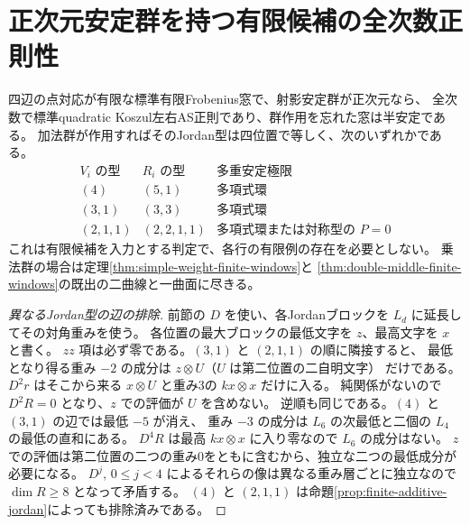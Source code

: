 \section{正次元安定群を持つ有限候補の全次数正則性}
\label{sec:finite-connected-regularity}
\begin{theorem}\label{thm:finite-connected-regularity}
四辺の点対応が有限な標準有限Frobenius窓で、射影安定群が正次元なら、
全次数で標準quadratic Koszul左右AS正則であり、群作用を忘れた窓は半安定である。
加法群が作用すればそのJordan型は四位置で等しく、次のいずれかである。
\[
\begin{array}{c|c|l}
V_i\text{ の型}&R_i\text{ の型}&\text{多重安定極限}\\\hline
(4)&(5,1)&\text{多項式環}\\
(3,1)&(3,3)&\text{多項式環}\\
(2,1,1)&(2,2,1,1)&\text{多項式環または対称型の }P=0
\end{array}
\]
これは有限候補を入力とする判定で、各行の有限例の存在を必要としない。
乗法群の場合は定理\ref{thm:simple-weight-finite-windows}と
\ref{thm:double-middle-finite-windows}の既出の二曲線と一曲面に尽きる。
\end{theorem}
\begin{proof}[異なるJordan型の辺の排除]
前節の $D$ を使い、各Jordanブロックを $L_d$ に延長してその対角重みを使う。
各位置の最大ブロックの最低文字を $z$、最高文字を $x$ と書く。
$zz$ 項は必ず零である。$(3,1)$ と $(2,1,1)$ の順に隣接すると、
最低となり得る重み $-2$ の成分は $z\otimes U$（$U$ は第二位置の二自明文字）
だけである。$D^2r$ はそこから来る $x\otimes U$ と重み3の $kx\otimes x$ だけに入る。
純関係がないので $D^2 R=0$ となり、$z$ での評価が $U$ を含めない。
逆順も同じである。$(4)$ と $(3,1)$ の辺では最低 $-5$ が消え、
重み $-3$ の成分は $L_6$ の次最低と二個の $L_4$ の最低の直和にある。
$D^4R$ は最高 $kx\otimes x$ に入り零なので $L_6$ の成分はない。
$z$ での評価は第二位置の二つの重み0をともに含むから、独立な二つの最低成分が必要になる。
$D^j$, $0\le j<4$ によるそれらの像は異なる重み層ごとに独立なので $\dim R\ge8$ となって矛盾する。
$(4)$ と $(2,1,1)$ は命題\ref{prop:finite-additive-jordan}によっても排除済みである。

\end{proof}
